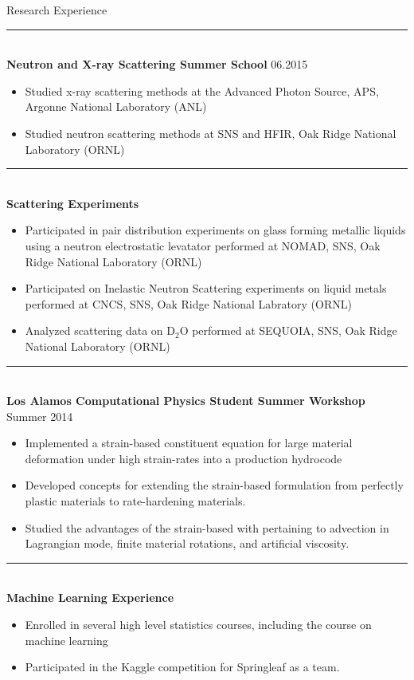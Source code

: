 \documentclass[9pt]{resume} %
\begin{document}
\begin{rSection}{Research Experience}
	{\centering\noindent\rule{5cm}{0.4pt}}
	\\
	{\bf Neutron and X-ray Scattering Summer School} \hfill {06.2015}
	\begin{itemize}\setlength\itemsep{-3pt}
		\item Studied x-ray scattering methods at the Advanced Photon Source, APS, Argonne National Laboratory (ANL)
		\item Studied neutron scattering methods at SNS and HFIR, Oak Ridge National Laboratory (ORNL)
	\end{itemize}
	{\centering\noindent\rule{5cm}{0.4pt}}
	\\
	{\bf Scattering Experiments}
	\begin{itemize}\setlength\itemsep{-3pt}
		\item Participated in pair distribution experiments on glass forming metallic liquids using a neutron electrostatic levatator performed at NOMAD, SNS, Oak Ridge National Laboratory (ORNL)
		\item Participated on Inelastic Neutron Scattering experiments on liquid metals performed at CNCS, SNS, Oak Ridge National Labratory (ORNL) 
		\item Analyzed scattering data on D$_2$O performed at SEQUOIA, SNS, Oak Ridge National Laboratory (ORNL)
	\end{itemize}
	{\centering\noindent\rule{5cm}{0.4pt}}
	\\
	{\bf Los Alamos Computational Physics Student Summer Workshop} \hfill {Summer 2014}
	\begin{itemize}\setlength\itemsep{-3pt}
		\item Implemented a strain-based constituent equation for large material deformation under high strain-rates into a production hydrocode
		\item Developed concepts for extending the strain-based formulation from perfectly plastic materials to rate-hardening materials.
		\item Studied the advantages of the strain-based with pertaining to advection in Lagrangian mode, finite material rotations, and artificial viscosity.
	\end{itemize}
	{\centering\noindent\rule{5cm}{0.4pt}}
	\\
	{\bf Machine Learning Experience}
	\begin{itemize}\setlength\itemsep{-3pt}
		\item Enrolled in several high level statistics courses, including the course on machine learning
		\item Participated in the Kaggle competition for Springleaf as a team. 

\end{itemize}
\end{rSection}
\end{document}
